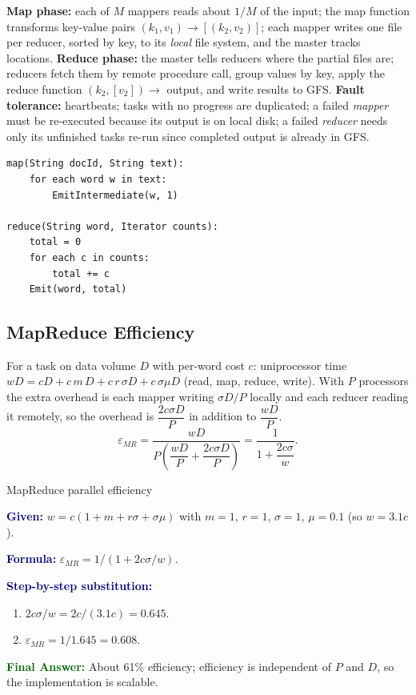 \documentclass[11pt,a4paper,openany]{report}
\newcommand{\Given}{\par\textbf{\textcolor{navy}{Given:}} }
\newcommand{\Formula}{\par\textbf{\textcolor{navy}{Formula:}} }
\newcommand{\Steps}{\par\textbf{\textcolor{navy}{Step-by-step substitution:}}\par}
\newcommand{\Answer}{\par\textbf{\textcolor{darkgreen}{Final Answer:}} }
\begin{document}
\textbf{Map phase:} each of $M$ mappers reads about $1/M$ of the input; the map function transforms key-value pairs
$(k_1,v_1)\to[(k_2,v_2)]$; each mapper writes one file per reducer, sorted by key, to its \emph{local} file system, and the master tracks
locations. \textbf{Reduce phase:} the master tells reducers where the partial files are; reducers fetch them by remote procedure call,
group values by key, apply the reduce function $(k_2,[v_2])\to$ output, and write results to GFS.
\textbf{Fault tolerance:} heartbeats; tasks with no progress are duplicated; a failed \emph{mapper} must be re-executed because its output
is on local disk; a failed \emph{reducer} needs only its unfinished tasks re-run since completed output is already in GFS.

\begin{lstlisting}
map(String docId, String text):
    for each word w in text:
        EmitIntermediate(w, 1)

reduce(String word, Iterator counts):
    total = 0
    for each c in counts:
        total += c
    Emit(word, total)
\end{lstlisting}

\subsection{MapReduce Efficiency}
For a task on data volume $D$ with per-word cost $c$: uniprocessor time
$wD = cD + c\,m\,D + c\,r\,\sigma D + c\,\sigma\mu D$ (read, map, reduce, write). With $P$ processors the extra overhead is each mapper writing
$\sigma D/P$ locally and each reducer reading it remotely, so the overhead is $\dfrac{2c\sigma D}{P}$ in addition to $\dfrac{wD}{P}$.
\[ \varepsilon_{MR} = \frac{wD}{P\left(\dfrac{wD}{P} + \dfrac{2c\sigma D}{P}\right)} = \frac{1}{1 + \dfrac{2c\sigma}{w}}. \]

\begin{solved}{MapReduce parallel efficiency}
\Given $w = c(1 + m + r\sigma + \sigma\mu)$ with $m = 1$, $r = 1$, $\sigma = 1$, $\mu = 0.1$ (so $w = 3.1c$).
\Formula $\varepsilon_{MR} = 1/(1 + 2c\sigma/w)$.
\Steps
\begin{enumerate}[leftmargin=*]
  \item $2c\sigma/w = 2c/(3.1c) = 0.645$.
  \item $\varepsilon_{MR} = 1/1.645 = 0.608$.
\end{enumerate}
\Answer About 61\% efficiency; efficiency is independent of $P$ and $D$, so the implementation is scalable.
\end{solved}
\end{document}
